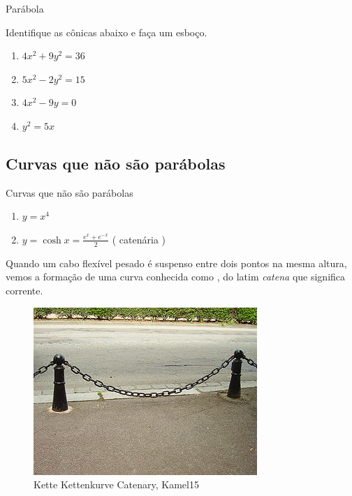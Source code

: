 \begin{frame}[label=conicas]{Parábola}
\begin{minipage}{0.3\textwidth}
\end{minipage}

\end{frame}

\begin{frame}[label=conicas]
\begin{exe}
Identifique as cônicas abaixo e faça um esboço.
\begin{enumerate}
\item $4x^2+9y^2=36$
\item $5x^2-2y^2=15$
\item $4x^2-9y=0$
\item $y^2=5x$
\end{enumerate}
\end{exe}

\end{frame}

\subsection*{Curvas que não são parábolas}
\begin{frame}[label=conicas]{Curvas que não são parábolas}
	\begin{enumerate}
		\item $y=x^4$
		\item $y=\cosh x=\frac{e^x+e^{-x}}{2}$  ( catenária ) 
	\end{enumerate}
	
	
	Quando um cabo flexível pesado é suspenso entre dois pontos  na mesma altura, vemos a formação de uma curva conhecida como , do latim \textit{catena} que significa corrente. 
	\begin{figure}
		\includegraphics[scale=0.5]{figuras/catenaria.png}
		\caption{Kette Kettenkurve Catenary, Kamel15}
	\end{figure}
	
\end{frame}


